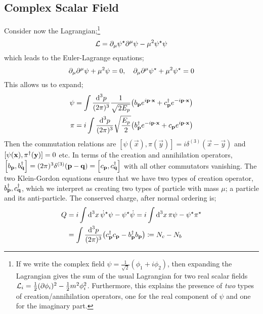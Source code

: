 \subsection{Complex Scalar Field}
Consider now the Lagrangian;\footnote{If we write the complex field $\psi = \tfrac{1}{\sqrt{2}}(\phi_1 + i \phi_2)$, then expanding the Lagrangian gives the sum of the usual Lagrangian for two real scalar fields $\mathcal{L}_i = \tfrac{1}{2}(\partial \phi_i)^2 - \tfrac{1}{2}m^2 \phi_i^2$. Furthermore, this explains the presence of \emph{two} types of creation/annihilation operators, one for the real component of $\psi$ and one for the imaginary part.}
\begin{equation}
\mathcal{L} = \partial_\mu \psi^{\star} \partial^\mu \psi - \mu^2 \psi^{\star} \psi
\end{equation}
which leads to the Euler-Lagrange equations;
\begin{equation}
\partial_\mu \partial^\mu \psi + \mu^2 \psi = 0, \quad \partial_\mu \partial^\mu \psi^{\star} + \mu^2 \psi^{\star} = 0
\end{equation}
This allows us to expand;
\begin{align}
\psi &= \int{\frac{\ud^3 p}{(2\pi)^3}\frac{1}{\sqrt{2E_p}}\left(b_{\vec p}e^{i\vec{p}\cdot \vec{x}} + c\dagg_{\vec p}e^{-i \vec{p}\cdot \vec{x}}\right)} \\
\pi &=i \int{\frac{\ud^3 p}{(2\pi)^3}\sqrt{\frac{E_p}{2}}\left(b_{\vec p}\dagg e^{-i\vec{p}\cdot \vec{x}} + c_{\vec p}e^{i \vec{p}\cdot \vec{x}}\right)}
\end{align}
Then the commutation relations are $\left[\psi(\vec x), \pi(\vec y)\right] = i\delta^{(3)}(\vec x - \vec y)$ and $[\psi(\mathbf x), \pi^{\dagger}(\mathbf y)] = 0$ etc. In terms of the creation and annihilation operators, $\left[b_{\vec p}, b\dagg_{\vec q}\right] = (2\pi)^3\delta^{(3)}(\vec p - \vec q) = \left[c_{\vec p}, c\dagg_{\vec q}\right]$ with all other commutators vanishing. The two Klein-Gordon equations ensure that we have two types of creation operator, $b_{\mathbf p}^{\dagger}, c_{\mathbf q}^{\dagger}$, which we interpret as creating two types of particle with mass $\mu$; a particle and its anti-particle. The conserved charge, after normal ordering is;
\begin{align}
Q &= i\int{\upd{^3 x} \dot{\psi}^{\star}\psi - \psi^{\star} \dot{\psi}} = i\int{\upd{^3 x}\pi\psi - \psi^{\star}\pi^{\star}} \nonumber \\
&= \int{\frac{\ud^3 p}{(2\pi)^3}\left(c_{\vec p}\dagg c_{\vec p} - b_{\vec p}\dagg b_{\vec p}\right)} \coloneqq N_c - N_b
\end{align}
